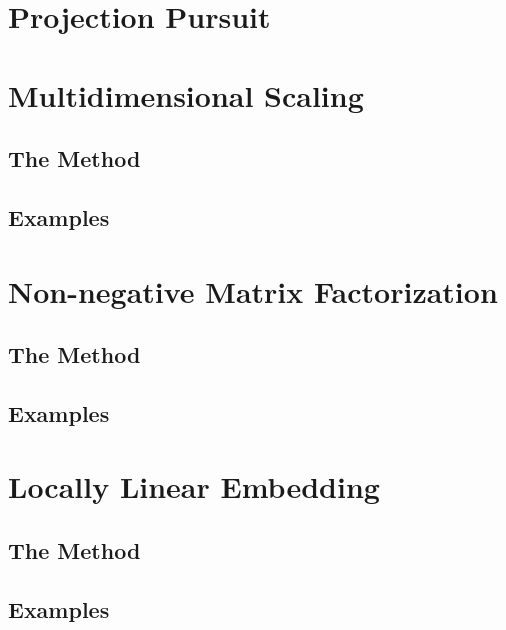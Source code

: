 \documentclass[11pt, oneside]{book}
\begin{document}
\section{Projection Pursuit}


\section{Multidimensional Scaling}

\subsection{The Method}


\subsection{Examples}


\section{Non-negative Matrix Factorization}

\subsection{The Method}


\subsection{Examples}


\section{Locally Linear Embedding}

\subsection{The Method}


\subsection{Examples}

\end{document}

